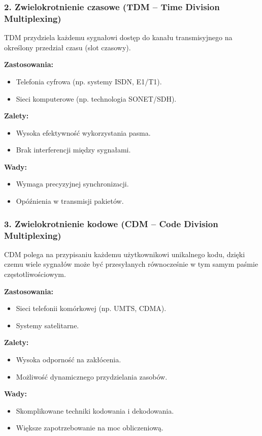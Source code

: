 \subsubsection{2. Zwielokrotnienie czasowe (TDM – Time Division Multiplexing)}
TDM przydziela każdemu sygnałowi dostęp do kanału transmisyjnego na określony przedział czasu (slot czasowy).

\textbf{Zastosowania:}
\begin{itemize}
    \item Telefonia cyfrowa (np. systemy ISDN, E1/T1).
    \item Sieci komputerowe (np. technologia SONET/SDH).
\end{itemize}

\textbf{Zalety:}
\begin{itemize}
    \item Wysoka efektywność wykorzystania pasma.
    \item Brak interferencji między sygnałami.
\end{itemize}

\textbf{Wady:}
\begin{itemize}
    \item Wymaga precyzyjnej synchronizacji.
    \item Opóźnienia w transmisji pakietów.
\end{itemize}

\subsubsection{3. Zwielokrotnienie kodowe (CDM – Code Division Multiplexing)}
CDM polega na przypisaniu każdemu użytkownikowi unikalnego kodu, dzięki czemu wiele sygnałów może być przesyłanych równocześnie w tym samym paśmie częstotliwościowym.

\textbf{Zastosowania:}
\begin{itemize}
    \item Sieci telefonii komórkowej (np. UMTS, CDMA).
    \item Systemy satelitarne.
\end{itemize}

\textbf{Zalety:}
\begin{itemize}
    \item Wysoka odporność na zakłócenia.
    \item Możliwość dynamicznego przydzielania zasobów.
\end{itemize}

\textbf{Wady:}
\begin{itemize}
    \item Skomplikowane techniki kodowania i dekodowania.
    \item Większe zapotrzebowanie na moc obliczeniową.
\end{itemize}

